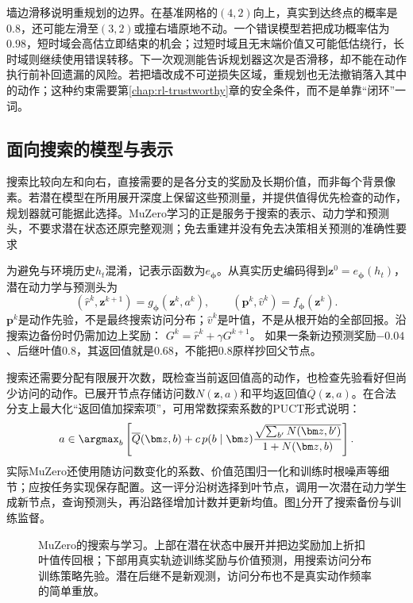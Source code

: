 墙边滑移说明重规划的边界。在基准网格的$(4,2)$向上，真实到达终点的概率是$0.8$，还可能左滑至$(3,2)$或撞右墙原地不动。一个错误模型若把成功概率估为$0.98$，短时域会高估立即结束的机会；过短时域且无末端价值又可能低估绕行，长时域则继续使用错误转移。下一次观测能告诉规划器这次是否滑移，却不能在动作执行前补回遗漏的风险。若把墙改成不可逆损失区域，重规划也无法撤销落入其中的动作；这种约束需要第\ref{chap:rl-trustworthy}章的安全条件，而不是单靠“闭环”一词。

\subsection{面向搜索的模型与表示}
\label{sec:rl-learning-muzero}

搜索比较向左和向右，直接需要的是各分支的奖励及长期价值，而非每个背景像素。若潜在模型在所用展开深度上保留这些预测量，并提供值得优先检查的动作，规划器就可能据此选择。MuZero学习的正是服务于搜索的表示、动力学和预测头，不要求潜在状态还原完整观测；免去重建并没有免去决策相关预测的准确性要求

为避免与环境历史$h_t$混淆，记表示函数为$e_{\bm\phi}$。从真实历史编码得到$\bm z^0=e_{\bm\phi}(h_t)$，潜在动力学与预测头为
\begin{equation}
  (\widehat r^k,\bm z^{k+1})=g_{\bm\phi}(\bm z^k,a^k),
  \qquad
  (\bm p^k,\widehat v^k)=f_{\bm\phi}(\bm z^k).
  \label{eq:rl-learning-muzero-model}
\end{equation}
$\bm p^k$是动作先验，不是最终搜索访问分布；$\widehat v^k$是叶值，不是从根开始的全部回报。沿搜索边备份时仍需加边上奖励：
$G^k=\widehat r^k+\gamma G^{k+1}$。
如果一条新边预测奖励$-0.04$、后继叶值$0.8$，其返回值就是$0.68$，不能把$0.8$原样抄回父节点。

搜索还需要分配有限展开次数，既检查当前返回值高的动作，也检查先验看好但尚少访问的动作。已展开节点存储访问数$N(\bm z,a)$和平均返回值$\overline Q(\bm z,a)$。在合法分支上最大化“返回值加探索项”，可用常数探索系数的PUCT形式说明：
\[
  a\in\argmax_b\left[
    \overline Q(\bm z,b)
    +c\,p(b\mid\bm z)
      \frac{\sqrt{\sum_{b'}N(\bm z,b')}}{1+N(\bm z,b)}
  \right].
\]
实际MuZero还使用随访问数变化的系数、价值范围归一化和训练时根噪声等细节；应按任务实现保存配置。这一评分沿树选择到叶节点，调用一次潜在动力学生成新节点，查询预测头，再沿路径增加计数并更新均值。图\ref{fig:rl-learning-muzero}分开了搜索备份与训练监督。

\begin{figure}[t]
  \centering
  
  \caption{MuZero的搜索与学习。上部在潜在状态中展开并把边奖励加上折扣叶值传回根；下部用真实轨迹训练奖励与价值预测，用搜索访问分布训练策略先验。潜在后继不是新观测，访问分布也不是真实动作频率的简单重放。}
  \label{fig:rl-learning-muzero}
\end{figure}

